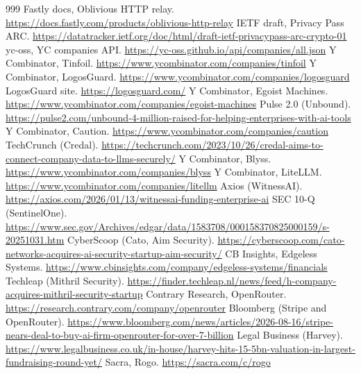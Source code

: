 \documentclass[10pt,a4paper]{article}
\begin{document}
\begin{thebibliography}{999}
 Fastly docs, Oblivious HTTP relay. \url{https://docs.fastly.com/products/oblivious-http-relay}
 IETF draft, Privacy Pass ARC. \url{https://datatracker.ietf.org/doc/html/draft-ietf-privacypass-arc-crypto-01}
 yc-oss, YC companies API. \url{https://yc-oss.github.io/api/companies/all.json}
 Y Combinator, Tinfoil. \url{https://www.ycombinator.com/companies/tinfoil}
 Y Combinator, LogosGuard. \url{https://www.ycombinator.com/companies/logosguard}
 LogosGuard site. \url{https://logosguard.com/}
 Y Combinator, Egoist Machines. \url{https://www.ycombinator.com/companies/egoist-machines}
 Pulse 2.0 (Unbound). \url{https://pulse2.com/unbound-4-million-raised-for-helping-enterprises-with-ai-tools}
 Y Combinator, Caution. \url{https://www.ycombinator.com/companies/caution}
 TechCrunch (Credal). \url{https://techcrunch.com/2023/10/26/credal-aims-to-connect-company-data-to-llms-securely/}
 Y Combinator, Blyss. \url{https://www.ycombinator.com/companies/blyss}
 Y Combinator, LiteLLM. \url{https://www.ycombinator.com/companies/litellm}
 Axios (WitnessAI). \url{https://axios.com/2026/01/13/witnessai-funding-enterprise-ai}
 SEC 10-Q (SentinelOne). \url{https://www.sec.gov/Archives/edgar/data/1583708/000158370825000159/s-20251031.htm}
 CyberScoop (Cato, Aim Security). \url{https://cyberscoop.com/cato-networks-acquires-ai-security-startup-aim-security/}
 CB Insights, Edgeless Systems. \url{https://www.cbinsights.com/company/edgeless-systems/financials}
 Techleap (Mithril Security). \url{https://finder.techleap.nl/news/feed/h-company-acquires-mithril-security-startup}
 Contrary Research, OpenRouter. \url{https://research.contrary.com/company/openrouter}
 Bloomberg (Stripe and OpenRouter). \url{https://www.bloomberg.com/news/articles/2026-08-16/stripe-nears-deal-to-buy-ai-firm-openrouter-for-over-7-billion}
 Legal Business (Harvey). \url{https://www.legalbusiness.co.uk/in-house/harvey-hits-15-5bn-valuation-in-largest-fundraising-round-yet/}
 Sacra, Rogo. \url{https://sacra.com/c/rogo}

\end{thebibliography}
\end{document}
